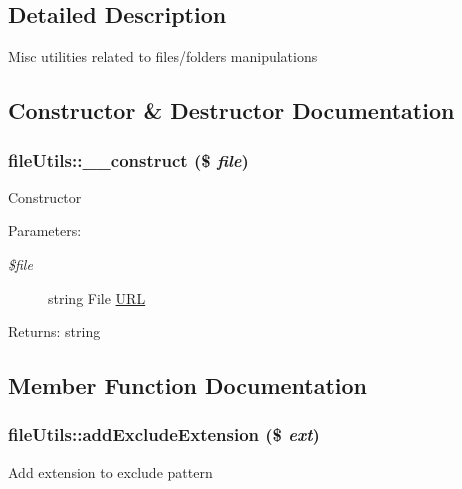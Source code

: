 \subsection{Detailed Description}
Misc utilities related to files/folders manipulations 

\subsection{Constructor \& Destructor Documentation}
\hypertarget{classfileUtils_08e3f045c12ddf7cee8c58628e49439c}{
\subsubsection[\_\-\_\-construct]{\setlength{\rightskip}{0pt plus 5cm}fileUtils::\_\-\_\-construct (\$ {\em file})}}
\label{classfileUtils_08e3f045c12ddf7cee8c58628e49439c}


Constructor

\begin{Desc}
\item[Parameters:]
\begin{description}
\item[{\em \$file}]string File \hyperlink{classURL}{URL} \end{description}
\end{Desc}
\begin{Desc}
\item[Returns:]string \end{Desc}


\subsection{Member Function Documentation}
\hypertarget{classfileUtils_6c06a85fd126b8feee00d3d698e11867}{
\subsubsection[addExcludeExtension]{\setlength{\rightskip}{0pt plus 5cm}fileUtils::addExcludeExtension (\$ {\em ext})}}
\label{classfileUtils_6c06a85fd126b8feee00d3d698e11867}


Add extension to exclude pattern

